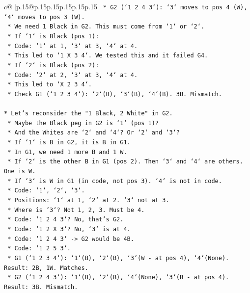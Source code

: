 \documentclass{article}
\begin{document}
{\begin{supertabular}{c@{$\;$}|p{.15\linewidth}@{}p{.15\linewidth}p{.15\linewidth}p{.15\linewidth}p{.15\linewidth}p{.15\linewidth}}
{{{\texttt{        *   G2 (`1 2 4 3`): `3` moves to pos 4 (W), `4` moves to pos 3 (W).} \\
\texttt{        *   We need 1 Black in G2. This must come from `1` or `2`.} \\
\texttt{        *   If `1` is Black (pos 1):} \\
\texttt{            *   Code: `1` at 1, `3` at 3, `4` at 4.} \\
\texttt{            *   This led to `1 X 3 4`. We tested this and it failed G4.} \\
\texttt{        *   If `2` is Black (pos 2):} \\
\texttt{            *   Code: `2` at 2, `3` at 3, `4` at 4.} \\
\texttt{            *   This led to `X 2 3 4`.} \\
\texttt{            *   Check G1 (`1 2 3 4`): `2`(B), `3`(B), `4`(B). 3B. Mismatch.} \\
\\ 
\texttt{*   Let's reconsider the "1 Black, 2 White" in G2.} \\
\texttt{    *   Maybe the Black peg in G2 is `1` (pos 1)?} \\
\texttt{    *   And the Whites are `2` and `4`? Or `2` and `3`?} \\
\texttt{    *   If `1` is B in G2, it is B in G1.} \\
\texttt{    *   In G1, we need 1 more B and 1 W.} \\
\texttt{    *   If `2` is the other B in G1 (pos 2). Then `3` and `4` are others. One is W.} \\
\texttt{    *   If `3` is W in G1 (in code, not pos 3). `4` is not in code.} \\
\texttt{    *   Code: `1`, `2`, `3`.} \\
\texttt{    *   Positions: `1` at 1, `2` at 2. `3` not at 3.} \\
\texttt{    *   Where is `3`? Not 1, 2, 3. Must be 4.} \\
\texttt{    *   Code: `1 2 4 3`? No, that's G2.} \\
\texttt{    *   Code: `1 2 X 3`? No, `3` is at 4.} \\
\texttt{    *   Code: `1 2 4 3` {-}> G2 would be 4B.} \\
\texttt{    *   Code: `1 2 5 3`.} \\
\texttt{        *   G1 (`1 2 3 4`): `1`(B), `2`(B), `3`(W {-} at pos 4), `4`(None). Result: 2B, 1W. Matches.} \\
\texttt{        *   G2 (`1 2 4 3`): `1`(B), `2`(B), `4`(None), `3`(B {-} at pos 4). Result: 3B. Mismatch.} \\
}}}
\end{supertabular}}
\end{document}
